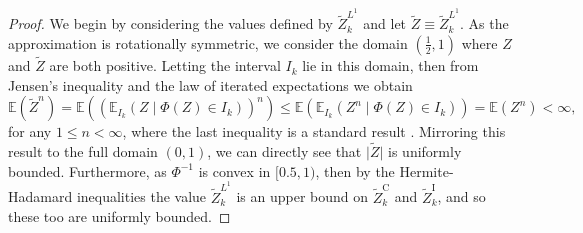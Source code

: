 \documentclass[manuscript,review]{acmart}
\begin{document}
\begin{proof}
We begin by considering the values defined by $ \tilde{Z}_k^{L^1} $ and let $ \tilde{Z} \equiv  \tilde{Z}_k^{L^1}$. As the approximation is rotationally symmetric, we consider the domain $ (\tfrac{1}{2}, 1) $ where $ Z $ and $ \tilde{Z} $ are both positive. Letting the interval $ I_k $ lie in this domain, then from Jensen's inequality and the law of iterated expectations we obtain 
\begin{equation*}
\mathbb{E}(\tilde{Z}^n) = \mathbb{E}((\mathbb{E}_{I_k}(Z \mid \Phi(Z) \in I_k))^n) \leq \mathbb{E}(\mathbb{E}_{I_k}(Z^n \mid \Phi(Z) \in I_k)) =  \mathbb{E}(Z^n) < \infty,
\end{equation*}
for any $ 1\leq n < \infty $, where the last inequality is a standard result \citep[C.2]{blundell2014concepts}. Mirroring this result to the full domain $ (0, 1) $, we can directly see that $ \lvert \tilde{Z} \rvert $ is uniformly bounded. Furthermore, as $ \Phi^{-1} $ is convex in $ [0.5, 1) $, then by the Hermite-Hadamard inequalities the value $ \tilde{Z}_k^{L^1} $ is an upper bound on $ \tilde{Z}_k^\mathrm{C} $ and $ \tilde{Z}_k^\mathrm{I} $, and so these too are uniformly bounded. 


\end{proof}
\end{document}

